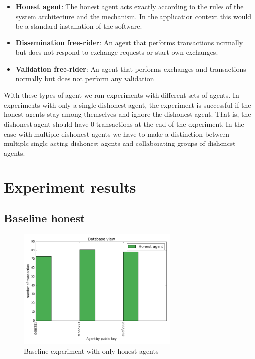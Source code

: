 \begin{itemize}
    \item \textbf{Honest agent}: The honest agent acts exactly according to the rules of the system
    architecture and the mechanism. In the application context this would be a standard installation 
    of the software.
    \item \textbf{Dissemination free-rider}: An agent that performs transactions normally but does
    not respond to exchange requests or start own exchanges.
    \item \textbf{Validation free-rider}: An agent that performs exchanges and transactions normally
    but does not perform any validation
\end{itemize}

With these types of agent we run experiments with different sets of agents. In experiments with only
a single dishonest agent, the experiment is successful if the honest agents stay among themselves
and ignore the dishonest agent. That is, the dishonest agent should have 0 transactions at the end
of the experiment. In the case with multiple dishonest agents we have to make a distinction between
multiple single acting dishonest agents and collaborating groups of dishonest agents. 

\section{Experiment results}
\subsection{Baseline honest}


\begin{figure}[h!]
    \centering
    \includegraphics[width=0.7\textwidth]{images/baseline_honest}
    \caption{Baseline experiment with only honest agents}
    \label{baseline_honest}
\end{figure}

